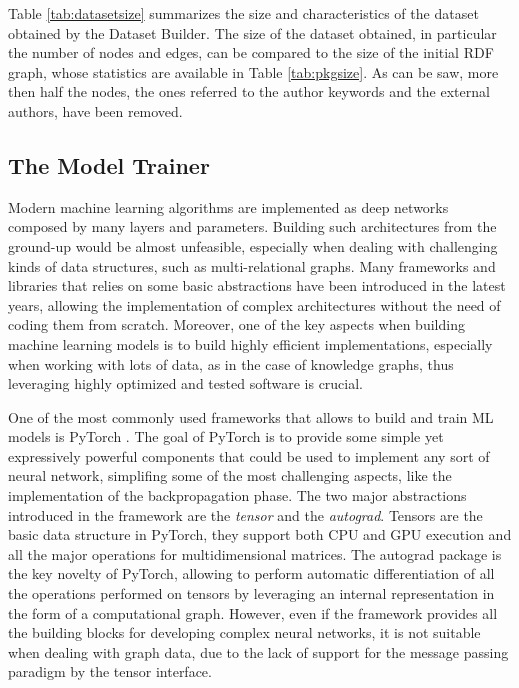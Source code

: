 \documentclass[%
    corpo=13.5pt,
    twoside,
    oldstyle,
    tipotesi=magistrale,
    greek,
    evenboxes
]{toptesi}
\begin{document}
Table \ref{tab:datasetsize} summarizes the size and characteristics of the
dataset obtained by the Dataset Builder.
The size of the dataset obtained, in particular the number of nodes and edges,
can be compared to the size of the initial RDF graph, whose statistics are
available in Table \ref{tab:pkgsize}.
As can be saw, more then half the nodes, the ones referred to the
author keywords and the external authors, have been removed.


\subsection{The Model Trainer}

Modern machine learning algorithms are implemented as deep networks
composed by many layers and parameters. Building such architectures from the
ground-up would be almost unfeasible, especially when dealing with challenging
kinds of data structures, such as multi-relational graphs.
Many frameworks and libraries that relies on some basic abstractions have been
introduced in the latest years, allowing the implementation of complex
architectures without the need of coding them from scratch. Moreover, one
of the key aspects when building machine learning models is to build highly
efficient implementations, especially when working with lots of data, as in the
case of knowledge graphs, thus leveraging highly optimized and tested software
is crucial.

One of the most commonly used frameworks that allows to build and train
ML models is PyTorch \cite{paszke2017}. The goal of PyTorch is to provide
some simple yet expressively powerful components that could be used to implement
any sort of neural network, simplifing some of the most challenging aspects,
like the implementation of the backpropagation phase.
The two major abstractions introduced in the framework are the \emph{tensor}
and the \emph{autograd}.
Tensors are the basic data structure in PyTorch, they support both CPU and GPU
execution and all the major operations for multidimensional matrices.
The autograd package is the key novelty of PyTorch, allowing to perform
automatic differentiation of all the operations performed on tensors by
leveraging an internal representation in the form of a computational graph.
However, even if the framework provides all the building blocks for
developing complex neural networks, it is not suitable when dealing with graph
data, due to the lack of support for the message passing paradigm by the
tensor interface.
\end{document}
